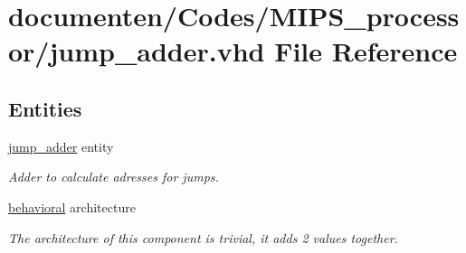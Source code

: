 \hypertarget{jump__adder_8vhd}{\section{documenten/\-Codes/\-M\-I\-P\-S\-\_\-processor/jump\-\_\-adder.vhd File Reference}
\label{jump__adder_8vhd}
}
\subsection*{Entities}
\begin{DoxyCompactItemize}
\item 
\hyperlink{classjump__adder}{jump\-\_\-adder} entity
\begin{DoxyCompactList}\small\item\em Adder to calculate adresses for jumps. \end{DoxyCompactList}\item 
\hyperlink{classjump__adder_1_1behavioral}{behavioral} architecture
\begin{DoxyCompactList}\small\item\em The architecture of this component is trivial, it adds 2 values together. \end{DoxyCompactList}\end{DoxyCompactItemize}
